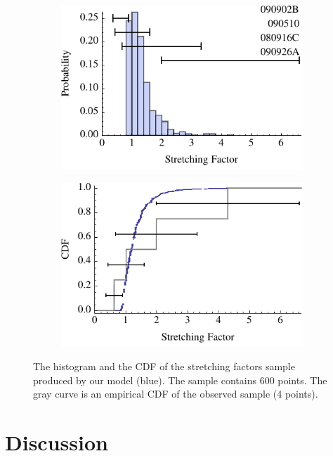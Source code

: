 \documentclass{article}
\begin{document}
\begin{figure}
        \centering
        \begin{subfigure}{0.49\textwidth}
                \includegraphics[width=\textwidth]{kappaDistributionHistogram}
                \label{fig:kappaDistributionHistogram}
        \end{subfigure}
        \begin{subfigure}{0.49\textwidth}
                \includegraphics[width=\textwidth]{kappaDistributionCDF}
                \label{fig:kappaDistributionCDF}
        \end{subfigure}
        \caption{The histogram and the CDF of the stretching factors sample produced by our model (blue). The sample contains $600$ points. The gray curve is an empirical CDF of the observed sample (4 points).}
        \label{fig:kappaDistribution}
\end{figure}

\section{Discussion}



\end{document}
